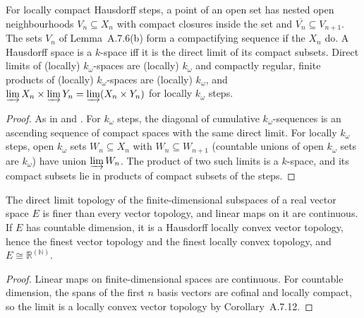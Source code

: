 \begin{theorem}
  \label{thm:top-dl-komega}
  \leanok
  For locally compact Hausdorff steps, a point of an open set has nested open neighbourhoods
  $V_n \subseteq X_n$ with compact closures inside the set and $\overline{V_n} \subseteq V_{n+1}$.
  The sets $V_n$ of Lemma~A.7.6(b) form a compactifying sequence if the $X_n$ do. A Hausdorff
  space is a $k$-space iff it is the direct limit of its compact subsets. Direct limits of
  (locally) $k_\omega$-spaces are (locally) $k_\omega$ and compactly regular, finite products of
  (locally) $k_\omega$-spaces are (locally) $k_\omega$, and
  $\varinjlim X_n \times \varinjlim Y_n = \varinjlim (X_n \times Y_n)$ for locally $k_\omega$
  steps.
\end{theorem}

\begin{proof}
  \leanok
  As in \cite{GN26} and \cite{GGH10}. For $k_\omega$ steps, the diagonal of cumulative
  $k_\omega$-sequences is an ascending sequence of compact spaces with the same direct limit. For
  locally $k_\omega$ steps, open $k_\omega$ sets $W_n \subseteq X_n$ with $W_n \subseteq W_{n+1}$
  (countable unions of open $k_\omega$ sets are $k_\omega$) have union $\varinjlim W_n$. The
  product of two such limits is a $k$-space, and its compact subsets lie in products of compact
  subsets of the steps.
\end{proof}

\begin{theorem}
  \label{thm:top-dl-finite}
  \leanok
  The direct limit topology of the finite-dimensional subspaces of a real vector space $E$ is finer
  than every vector topology, and linear maps on it are continuous. If $E$ has countable
  dimension, it is a Hausdorff locally convex vector topology, hence the finest vector topology
  and the finest locally convex topology, and $E \cong \mathbb{R}^{(\mathbb{N})}$.
\end{theorem}

\begin{proof}
  \leanok
  Linear maps on finite-dimensional spaces are continuous. For countable dimension, the spans of
  the first $n$ basis vectors are cofinal and locally compact, so the limit is a locally convex
  vector topology by Corollary~A.7.12.
\end{proof}
